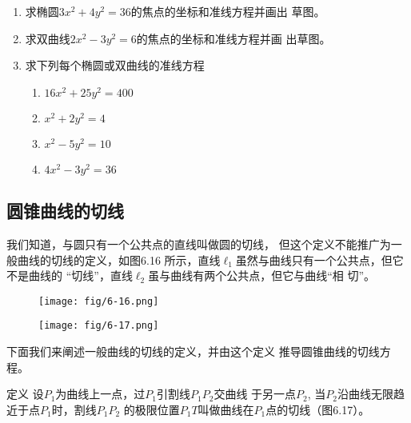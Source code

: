 \begin{ex}
\begin{enumerate}
    \item 求椭圆$3x^2+4y^2=36$的焦点的坐标和准线方程并画出
    草图。
    \item 求双曲线$2x^2-3y^2=6$的焦点的坐标和准线方程并画
    出草图。
    \item 求下列每个椭圆或双曲线的准线方程
\begin{multicols}{2}
\begin{enumerate}
    \item $16x^2+25y^2=400$
    \item $x^2+2y^2=4$
    \item $x^2-5y^2=10$
    \item $4x^2-3y^2=36$
\end{enumerate}
\end{multicols}
\end{enumerate} 
\end{ex}


\subsection{圆锥曲线的切线}
我们知道，与圆只有一个公共点的直线叫做圆的切线，
但这个定义不能推广为一般曲线的切线的定义，如图6.16
所示，直线$\ell_1$虽然与曲线只有一个公共点，但它不是曲线的
“切线”，直线$\ell_2$虽与曲线有两个公共点，但它与曲线“相
切”。

\begin{figure}[htp]\centering
    \begin{minipage}[t]{0.48\textwidth}
    \centering
\texttt{[image: fig/6-16.png]}
    \caption{}
    \end{minipage}
    \begin{minipage}[t]{0.48\textwidth}
    \centering
\texttt{[image: fig/6-17.png]}
    \caption{}
    \end{minipage}
    \end{figure}

下面我们来阐述一般曲线的切线的定义，并由这个定义
推导圆锥曲线的切线方程。

\begin{blk}
   {定义} 设$P_1$为曲线上一点，过$P_1$引割线$P_1P_2$交曲线
于另一点$P_2$, 当$P_2$沿曲线无限趋近于点$P_1$时，割线$P_1P_2$
的极限位置$P_1T$叫做曲线在$P_1$点的切线（图6.17）。 
\end{blk}


